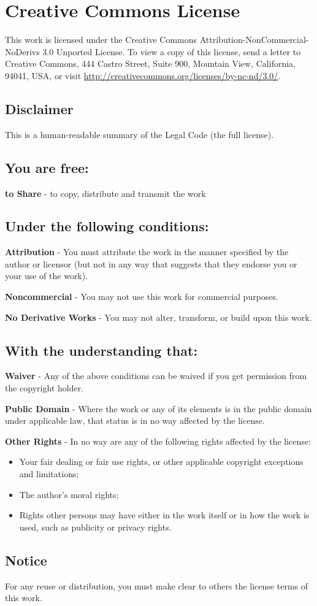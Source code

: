 \clearpage
\chapter{Creative Commons License}
\label{appendix:licensesummary}
This work is licensed under the Creative Commons
Attribution-NonCommercial-NoDerivs 3.0 Unported License. To view a copy of this
license, send a letter to Creative Commons, 444 Castro Street, Suite 900,
Mountain View, California, 94041, USA, or visit
\url{http://creativecommons.org/licenses/by-nc-nd/3.0/}.
\section*{Disclaimer} This is a human-readable summary of the Legal Code (the
full license).
\section*{You are free:}
    \textbf{to Share} - to copy, distribute and transmit the work
\section*{Under the following conditions:}
    \textbf{Attribution} - You must attribute the work in the manner specified
    by the author or licensor (but not in any way that suggests that they
    endorse you or your use of the work).

    \textbf{Noncommercial} - You may not use this work for commercial purposes.

    \textbf{No Derivative Works} - You may not alter, transform, or build upon
    this work.
\section*{With the understanding that:}
    \textbf{Waiver} - Any of the above conditions can be waived if you get
    permission from the copyright holder.

    \textbf{Public Domain} - Where the work or any of its elements is in the
    public domain under applicable law, that status is in no way affected by the
    license.

    \textbf{Other Rights} - In no way are any of the following rights affected
    by the license:
      \begin{itemize}
        \item {Your fair dealing or fair use rights, or other applicable
      copyright exceptions and limitations;}
        \item {The author's moral rights;}
        \item {Rights other persons may have either in the work itself or in how
      the work is used, such as publicity or privacy rights.}
      \end{itemize}

\nopagebreak

\section*{Notice} For any reuse or distribution, you must make clear to others
the license terms of this work.